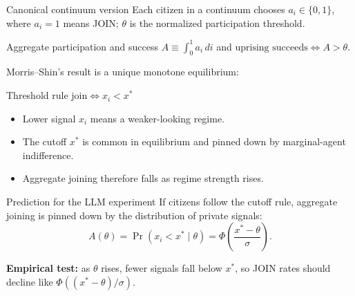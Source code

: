 \documentclass[aspectratio=169,12pt]{beamer}
\begin{document}
\begin{frame}{Canonical continuum version}
  \footnotesize
  Each citizen in a continuum chooses $a_i\in\{0,1\}$, where $a_i=1$ means JOIN; $\theta$ is the normalized participation threshold.

  \vspace{0.03cm}
  \begin{block}{Aggregate participation and success}
    \centering
    $A\equiv \int_0^1 a_i\,di$ \qquad and \qquad $\text{uprising succeeds} \iff A>\theta$.
  \end{block}

  \vspace{0.03cm}
  Morris--Shin's result is a unique monotone equilibrium:
  \begin{block}{Threshold rule}
    \centering\normalsize
    $\text{join} \iff x_i < x^*$
  \end{block}

  \vspace{0.03cm}
  \begin{itemize}\setlength\itemsep{0.08em}
    \item Lower signal $x_i$ means a weaker-looking regime.
    \item The cutoff $x^*$ is common in equilibrium and pinned down by marginal-agent indifference.
    \item Aggregate joining therefore falls as regime strength rises.
  \end{itemize}
\end{frame}

\begin{frame}{Prediction for the LLM experiment}
  \small
  If citizens follow the cutoff rule, aggregate joining is pinned down by the distribution of private signals:
  \[
    A(\theta)=\Pr(x_i<x^*\mid \theta)=\Phi\left(\frac{x^* - \theta}{\sigma}\right).
  \]

  \vspace{-0.1cm}
  \centering

  \vspace{-0.05cm}
  {\small\color{muted}\textbf{Empirical test:} as $\theta$ rises, fewer signals fall below $x^*$, so JOIN rates should decline like $\Phi((x^*-\theta)/\sigma)$.}
\end{frame}
\end{document}
